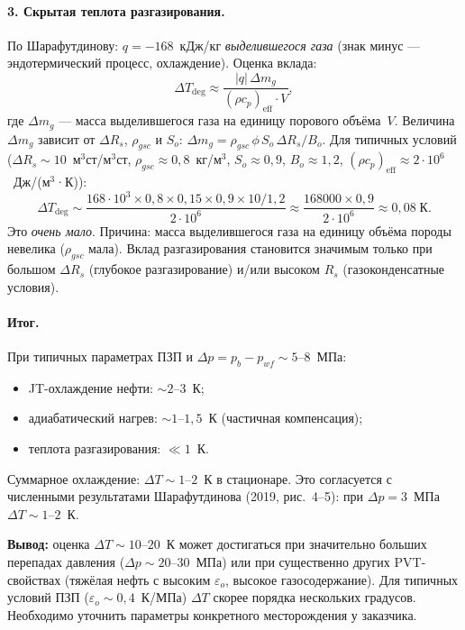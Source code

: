 ﻿\documentclass[12pt,a4paper]{article}
\begin{document}
\paragraph{3. Скрытая теплота разгазирования.}
По Шарафутдинову: $q = -168$~кДж/кг \emph{выделившегося газа}
(знак минус --- эндотермический процесс, охлаждение).
Оценка вклада:
\begin{equation}\label{eq:DT_deg}
  \Delta T_{\mathrm{deg}} \approx
  \frac{|q|\,\Delta m_g}{(\rho c_p)_{\mathrm{eff}} \cdot V},
\end{equation}
где $\Delta m_g$ --- масса выделившегося газа на единицу
порового объёма~$V$. Величина $\Delta m_g$ зависит от
$\Delta R_s$, $\rho_{gsc}$ и $S_o$:
$\Delta m_g = \rho_{gsc}\,\phi\,S_o\,\Delta R_s / B_o$.
Для типичных условий ($\Delta R_s \sim 10$~м$^3$ст/м$^3$ст,
$\rho_{gsc} \approx 0{,}8$~кг/м$^3$,
$S_o \approx 0{,}9$, $B_o \approx 1{,}2$,
$(\rho c_p)_{\mathrm{eff}} \approx 2 \cdot 10^6$~Дж/(м$^3$·К)):
\[
  \Delta T_{\mathrm{deg}} \sim
  \frac{168 \cdot 10^3 \times 0{,}8 \times 0{,}15
    \times 0{,}9 \times 10 / 1{,}2}
  {2 \cdot 10^6}
  \approx \frac{168000 \times 0{,}9}{2 \cdot 10^6}
  \approx 0{,}08\;\text{К}.
\]
Это \emph{очень мало}. Причина: масса выделившегося газа
на единицу объёма породы невелика ($\rho_{gsc}$ мала).
Вклад разгазирования становится значимым только при
большом $\Delta R_s$ (глубокое разгазирование) и/или
высоком $R_s$ (газоконденсатные условия).

\paragraph{Итог.}
При типичных параметрах ПЗП и $\Delta p = p_b - p_{wf}
\sim 5$--$8$~МПа:
\begin{itemize}[nosep]
  \item JT-охлаждение нефти: $\sim 2$--$3$~К;
  \item адиабатический нагрев: $\sim 1$--$1{,}5$~К
        (частичная компенсация);
  \item теплота разгазирования: $\ll 1$~К.
\end{itemize}
Суммарное охлаждение: $\Delta T \sim 1$--$2$~К
в стационаре. Это согласуется с численными результатами
Шарафутдинова (2019, рис.~4--5): при $\Delta p = 3$~МПа
$\Delta T \sim 1$--$2$~К.

\textbf{Вывод:} оценка $\Delta T \sim 10$--$20$~К
может достигаться при значительно больших перепадах
давления ($\Delta p \sim 20$--$30$~МПа) или при
существенно других PVT-свойствах (тяжёлая нефть
с высоким $\varepsilon_o$, высокое газосодержание).
Для типичных условий ПЗП ($\varepsilon_o \sim 0{,}4$~К/МПа)
$\Delta T$ скорее порядка нескольких градусов.
Необходимо уточнить параметры конкретного месторождения
у заказчика.
\end{document}
